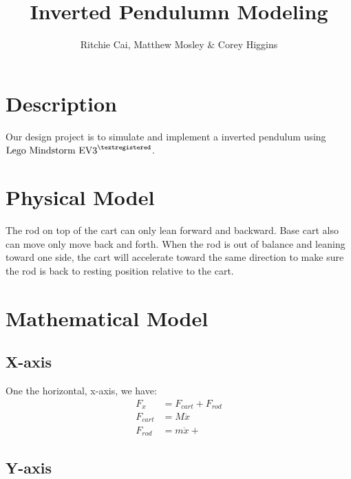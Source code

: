 \documentclass{notes}
\author{Ritchie Cai, Matthew Mosley \& Corey Higgins}
\title{Inverted Pendulumn Modeling}
\begin{document}
\maketitle 

\section{Description}
Our design project is to simulate and implement a inverted pendulum using 
$\text{Lego Mindstorm EV3}^{\textregistered}$. 

\section{Physical Model}


The rod on top of the cart can only lean forward and backward. 
Base cart also can move only move back and forth. 
When the rod is out of balance and leaning toward one side, the cart will accelerate toward the same
direction to make sure the rod is back to resting position relative to the cart.

\section{Mathematical Model}

\subsection{X-axis}
One the horizontal, x-axis, we have:
\begin{align*}
  F_x & = F_{cart} + F_{rod} \\
  F_{cart} & = M\ddot{x}  \\
  F_{rod} &  = m\ddot{x} + 
\end{align*}

\subsection{Y-axis}
\end{document}
